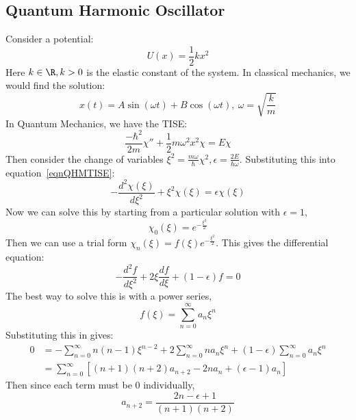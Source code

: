 \documentclass[../Main.tex]{subfiles}
\begin{document}
\subsection{Quantum Harmonic Oscillator}
Consider a potential:
\begin{equation*}
    U(x) = \frac12 k x^2
\end{equation*}
Here $k \in \R, k > 0$ is the elastic constant of the system.
In classical mechanics, we would find the solution:
\begin{equation*}
    x(t) = A\sin(\omega t) + B\cos(\omega t),~\omega = \sqrt{\frac{k}{m}}
\end{equation*}
In Quantum Mechanics, we have the TISE:
\begin{equation}
    \frac{-\hbar^2}{2m}\chi'' + \frac{1}{2}m\omega^2 x^2 \chi = E\chi
    \label{eqnQHMTISE}
\end{equation}
Then consider the change of variables $\xi^2 = \frac{m\omega}{\hbar}\chi^2, \epsilon = \frac{2E}{\hbar \omega}$. Substituting this into equation~\ref{eqnQHMTISE}:
\begin{equation}
    -\frac{d^{2}\chi(\xi)}{d\xi^{2}} + \xi^2 \chi(\xi) = \epsilon\chi(\xi)
    \label{eqnQHMScaledTISE}
\end{equation}
Now we can solve this by starting from a particular solution with $\epsilon = 1$,
\begin{equation}
    \chi_0(\xi) = e^{-\frac{\xi^2}{2}}
    \label{eqnQHMPartSoln}
\end{equation}
Then we can use a trial form $\chi_n(\xi) = f(\xi) e^{-\frac{\xi^2}{2}}$. This gives the differential equation:
\begin{equation}
    -\frac{d^{2}f}{d\xi^{2}} + 2\xi \frac{df}{d\xi} + (1 - \epsilon)f = 0
    \label{eqnQHMTrialEquation}
\end{equation}
The best way to solve this is with a power series,
\begin{equation}
    f(\xi) = \sum_{n=0}^{\infty} a_n \xi^n
    \label{eqnQHMSeries}
\end{equation}
Substituting this in gives:
\begin{align*}
    0 &= -\sum_{n=0}^{\infty} n(n-1) \xi^{n-2} + 2\sum_{n=0}^{\infty} na_n \xi^n + (1 - \epsilon) \sum_{n=0}^{\infty} a_n \xi^n \\
    &= \sum_{n = 0}^{\infty} \left[(n+1)(n+2) a_{n+2} - 2n a_n + (\epsilon - 1) a_n\right]
\end{align*}
Then since each term must be 0 individually,
\begin{equation}
    a_{n+2} = \frac{2n - \epsilon + 1}{(n+1)(n+2)}
    \label{eqnQHMRecurRelation}
\end{equation}
\end{document}
